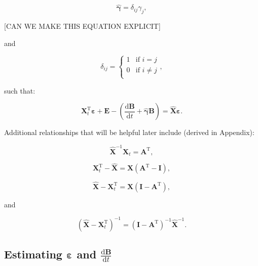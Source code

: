 \documentclass[authoryear,preprint,review,12pt]{elsarticle}
\let\oldhat\hat
\renewcommand{\vec}[1]{\mathbf{#1}}
\renewcommand{\hat}[1]{\oldhat{\mathbf{#1}}}
\begin{document}
\begin{equation} \label{eq:B_hat_matrix_def}
	\hat{\vec{\gamma}} = \delta_{ij}\gamma_{j},
\end{equation}

[CAN WE MAKE THIS EQUATION EXPLICIT]

\noindent and

\begin{equation}\label{eq:k_delta}
	\delta_{ij} = \begin{cases}	1 	& 	\text{if  } i = j		\\
												0	&	\text{if  } i \neq j	\\
						\end{cases},
\end{equation}

\noindent such that:

\begin{equation} \label{eq:matrix_leontief}
	\vec{X}_{t}^{\mathrm{T}}\vec{\varepsilon} + \vec{E} - \left(\frac{\mathrm{d}\vec{B}}{\mathrm{d}t} + \hat{\vec{\gamma}}\vec{B}\right) = \hat{\vec{X}}\vec{\varepsilon}.
\end{equation}

Additional relationships that will be helpful later include (derived in Appendix):

\begin{equation} \label{eq:Xhat_X_and_A}
	\hat{\vec{X}}^{-1}\vec{X}_{t} = \vec{A}^{\mathrm{T}},
\end{equation}

\begin{equation} \label{eq:Xdifference1}
	\vec{X}_{t}^{\mathrm{T}} - \hat{\vec{X}} = \hat{\vec{X}}(\vec{A}^{\mathrm{T}} - \vec{I}),
\end{equation}

\begin{equation} \label{eq:Xdifference2}
	\hat{\vec{X}} - \vec{X}_{t}^{\mathrm{T}} = \hat{\vec{X}}(\vec{I} - \vec{A}^{\mathrm{T}}),
\end{equation}

\noindent and

\begin{equation} \label{eq:Xdifference2_inverse}
	\left(\hat{\vec{X}} - \vec{X}_{t}^{\mathrm{T}}\right)^{-1} = (\vec{I} - \vec{A}^{\mathrm{T}})^{-1}\hat{\vec{X}}^{-1}.
\end{equation}


\subsection{Estimating $\vec{\varepsilon}$ and $\frac{\mathrm{d}\vec{B}}{\mathrm{d}t}$}
\end{document}
